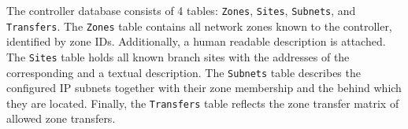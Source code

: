The controller database consists of 4 tables: \texttt{Zones}, \texttt{Sites}, \texttt{Subnets},
and \texttt{Transfers}. The \texttt{Zones} table contains all network zones known to the
controller, identified by zone IDs. Additionally, a human readable description is attached. The
\texttt{Sites} table holds all known branch sites with the addresses of the corresponding \tps
and a textual description. The \texttt{Subnets} table describes the configured IP subnets
together with their zone membership and the \tp behind which they are located. Finally, the
\texttt{Transfers} table reflects the zone transfer matrix of allowed zone transfers.